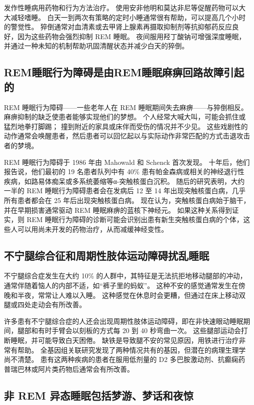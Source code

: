 发作性睡病用药物和行为方法治疗。 使用安非他明和莫达非尼等促醒药物可以大大减轻嗜睡。 白天一到两次有策略的定时小睡通常很有帮助，可以提高几个小时的警觉性。 猝倒通常对血清素或去甲肾上腺素再摄取抑制剂等抗抑郁药反应良好，因为这些药物会强烈抑制 REM 睡眠。 夜间服用羟丁酸钠可增强深度睡眠，并通过一种未知的机制帮助巩固清醒状态并减少白天的猝倒。

\subsection{REM睡眠行为障碍是由REM睡眠麻痹回路故障引起的}
REM 睡眠行为障碍——一些老年人在 REM 睡眠期间失去麻痹——与猝倒相反。 麻痹抑制的缺乏使患者能够实现他们的梦想。 个人经常大喊大叫，可能会抓住或猛烈地拳打脚踢； 撞到附近的家具或床伴而受伤的情况并不少见。 这些戏剧性的动作通常会唤醒患者，然后患者可以回忆起以与实际动作非常匹配的方式击退攻击者的梦境。

REM 睡眠行为障碍于 1986 年由 Mahowald 和 Schenck 首次发现。 十年后，他们报告说，他们最初的 19 名患者队列中有 40\% 患有帕金森病或相关的神经退行性疾病，如路易体痴呆或多系统萎缩等α-突触核蛋白沉积。 随后的研究表明，大约一半的 REM 睡眠行为障碍患者会在发病后 12 至 14 年出现突触核蛋白病，几乎所有患者都会在 25 年后出现突触核蛋白病。 现在认为，突触核蛋白病始于脑干，并在早期损害通常驱动 REM 睡眠麻痹的蓝核下神经元。 如果这种关系得到证实，则 REM 睡眠行为障碍的诊断可能会识别出患有新生突触核蛋白病的个体，这些人可以用尚未开发的药物治疗，从而减缓神经变性。

\subsection{不宁腿综合征和周期性肢体运动障碍扰乱睡眠}
不宁腿综合症发生在大约 10\% 的人群中，其特征是无法抗拒地移动腿部的冲动，通常伴随着恼人的内部不适，如“裤子里的蚂蚁”。 这种不安的感觉通常发生在傍晚和半夜，常常让人难以入睡。 这种感觉在休息时会更糟，但通过在床上移动双腿或四处走动会有所改善。


许多患有不宁腿综合症的人还会出现周期性肢体运动障碍，即在非快速眼动睡眠期间，腿部和有时手臂会以刻板的方式每 20 到 40 秒弯曲一次。 这些腿部运动会打断睡眠，并可能导致白天困倦。 缺铁是导致腿不安的常见原因，用铁进行治疗非常有帮助。 全基因组关联研究发现了两种情况共有的基因，但潜在的病理生理学尚不清楚。 患有这两种疾病的患者在服用低剂量的 D2 多巴胺激动剂、抗癫痫药普瑞巴林或阿片类药物后通常会有所改善。

\subsection{非 REM 异态睡眠包括梦游、梦话和夜惊}

